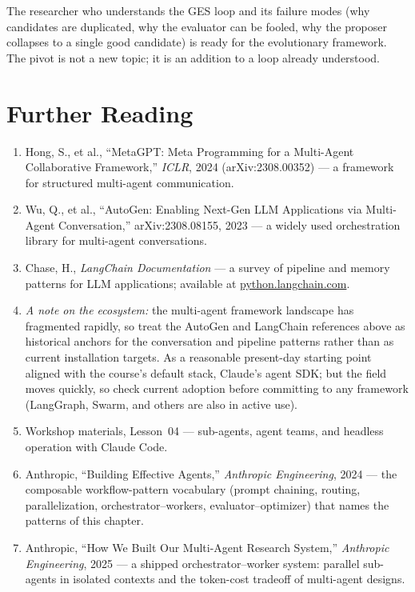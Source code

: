 The researcher who understands the GES loop and its failure modes (why candidates are duplicated, why the evaluator can be fooled, why the proposer collapses to a single good candidate) is ready for the evolutionary framework.
The pivot is not a new topic; it is an addition to a loop already understood.

\section*{Further Reading}

\begin{small}
\begin{enumerate}
\item Hong, S., et al., ``MetaGPT: Meta Programming for a Multi-Agent Collaborative Framework,'' \emph{ICLR}, 2024 (arXiv:2308.00352) — a framework for structured multi-agent communication.
\item Wu, Q., et al., ``AutoGen: Enabling Next-Gen LLM Applications via Multi-Agent Conversation,'' arXiv:2308.08155, 2023 — a widely used orchestration library for multi-agent conversations.
\item Chase, H., \emph{LangChain Documentation} — a survey of pipeline and memory patterns for LLM applications; available at \href{https://python.langchain.com}{python.langchain.com}.
\item \emph{A note on the ecosystem:} the multi-agent framework landscape has fragmented rapidly, so treat the AutoGen and LangChain references above as historical anchors for the conversation and pipeline patterns rather than as current installation targets. As a reasonable present-day starting point aligned with the course's default stack, Claude's agent SDK; but the field moves quickly, so check current adoption before committing to any framework (LangGraph, Swarm, and others are also in active use).
\item Workshop materials,  Lesson~04 — sub-agents, agent teams, and headless operation with Claude Code.
\item Anthropic, ``Building Effective Agents,'' \emph{Anthropic Engineering}, 2024 — the composable workflow-pattern vocabulary (prompt chaining, routing, parallelization, orchestrator--workers, evaluator--optimizer) that names the patterns of this chapter.
\item Anthropic, ``How We Built Our Multi-Agent Research System,'' \emph{Anthropic Engineering}, 2025 — a shipped orchestrator--worker system: parallel sub-agents in isolated contexts and the token-cost tradeoff of multi-agent designs.

\end{enumerate}
\end{small}
